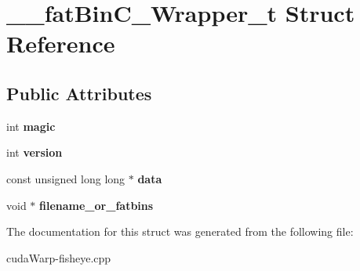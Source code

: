\hypertarget{struct____fatBinC__Wrapper__t}{}\section{\+\_\+\+\_\+fat\+Bin\+C\+\_\+\+Wrapper\+\_\+t Struct Reference}
\label{struct____fatBinC__Wrapper__t}
\subsection*{Public Attributes}
\begin{DoxyCompactItemize}
\item 
int {\bfseries magic}\hypertarget{struct____fatBinC__Wrapper__t_acf00fb963a61b419f115e3ff5673cd7a}{}\label{struct____fatBinC__Wrapper__t_acf00fb963a61b419f115e3ff5673cd7a}

\item 
int {\bfseries version}\hypertarget{struct____fatBinC__Wrapper__t_ab4412051e80bed7ba944e27b02df7cc0}{}\label{struct____fatBinC__Wrapper__t_ab4412051e80bed7ba944e27b02df7cc0}

\item 
const unsigned long long $\ast$ {\bfseries data}\hypertarget{struct____fatBinC__Wrapper__t_adf1c9152282a8f38bc1dfb8415131e45}{}\label{struct____fatBinC__Wrapper__t_adf1c9152282a8f38bc1dfb8415131e45}

\item 
void $\ast$ {\bfseries filename\+\_\+or\+\_\+fatbins}\hypertarget{struct____fatBinC__Wrapper__t_a636ec4e50fe3a2ca484631bfb0396152}{}\label{struct____fatBinC__Wrapper__t_a636ec4e50fe3a2ca484631bfb0396152}

\end{DoxyCompactItemize}


The documentation for this struct was generated from the following file\+:\begin{DoxyCompactItemize}
\item 
cuda\+Warp-\/fisheye.\+cpp\end{DoxyCompactItemize}
